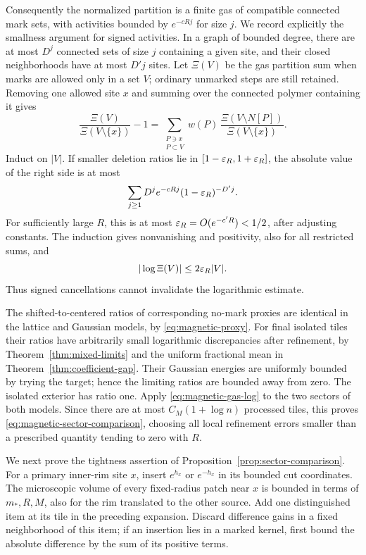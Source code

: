 Consequently the normalized partition is a finite gas of
compatible connected mark sets, with activities bounded by
\(e^{-cRj}\) for size \(j\). We record explicitly the smallness
argument for signed activities. In a graph of bounded degree,
there are at most \(D^j\) connected sets of size \(j\) containing
a given site, and their closed neighborhoods have at most
\(D'j\) sites. Let \(\Xi(V)\) be the gas partition sum when marks
are allowed only in a set \(V\); ordinary unmarked steps are
still retained. Removing one allowed site \(x\) and summing
over the connected polymer containing it gives
\[
 \frac{\Xi(V)}{\Xi(V\setminus\{x\})}-1
  =\sum_{\substack{P\ni x\\P\subset V}}
       w(P)\,
       \frac{\Xi(V\setminus N[P])}
            {\Xi(V\setminus\{x\})}.
\]
Induct on \(|V|\). If smaller deletion ratios lie in
\([1-\varepsilon_R,1+\varepsilon_R]\), the absolute value of the right side
is at most
\[
       \sum_{j\ge1}D^j e^{-cRj}(1-\varepsilon_R)^{-D'j}.
\]
For sufficiently large \(R\), this is at most
\(\varepsilon_R=O(e^{-c'R})<1/2\), after adjusting constants.
The induction gives nonvanishing and positivity, also for all
restricted sums, and
\begin{equation}\label{eq:magnetic-gas-log}
                         |\log\Xi(V)|\le 2\varepsilon_R|V|.
\end{equation}
Thus signed cancellations cannot invalidate the logarithmic
estimate.

The shifted-to-centered ratios of corresponding no-mark proxies
are identical in the lattice and Gaussian models, by
\eqref{eq:magnetic-proxy}. For final isolated tiles their ratios
have arbitrarily small logarithmic discrepancies after refinement,
by Theorem~\ref{thm:mixed-limits} and the uniform fractional mean
in Theorem~\ref{thm:coefficient-gap}. Their Gaussian energies are
uniformly bounded by trying the target; hence the limiting
ratios are bounded away from zero. The isolated exterior has
ratio one. Apply \eqref{eq:magnetic-gas-log} to the two sectors
of both models. Since there are at most \(C_M(1+\log n)\)
processed tiles, this proves
\eqref{eq:magnetic-sector-comparison}, choosing all local
refinement errors smaller than a prescribed quantity tending
to zero with \(R\).

We next prove the tightness assertion of
Proposition~\ref{prop:sector-comparison}. For a primary inner-rim
site \(x\), insert \(e^{h_x}\) or \(e^{-h_x}\) in its bounded
cut coordinates. The microscopic volume of every fixed-radius
patch near \(x\) is bounded in terms of \(m_*,R,M\), also for
the rim translated to the other source. Add one distinguished
item at its tile in the preceding expansion. Discard difference
gains in a fixed neighborhood of this item; if an insertion
lies in a marked kernel, first bound the absolute difference
by the sum of its positive terms.

